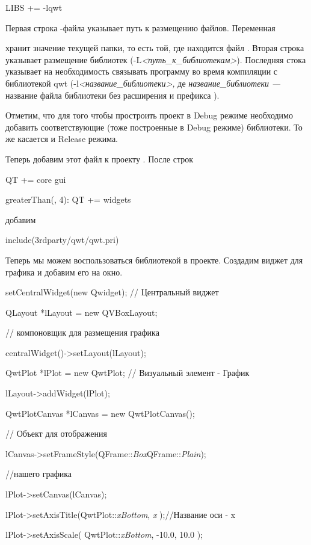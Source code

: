 LIBS += -lqwt

Первая строка -файла указывает путь к размещению
файлов. Переменная 

\Sys{\$\$} хранит значение текущей папки, то есть той, где
находится файл . Вторая строка указывает размещение библиотек
(-L\textit{{<}}\textit{путь\_к\_библиотекам}\textit{{>}}). Последняя стока указывает на
необходимость связывать программу во время компиляции с библиотекой qwt
(-l\textit{{<}}\textit{название\_библиотеки}\textit{{>}, }де \textit{название\_библиотеки}\textit{ ---
}название файла библиотеки без расширения и префикса ).

Отметим, что для того чтобы простроить проект в Debug режиме необходимо добавить соответствующие (тоже построенные в
Debug режиме) библиотеки. То же касается и Release режима. 

Теперь добавим этот файл к проекту . После строк

QT  += core gui

greaterThan(, 4): QT += widgets

добавим

include(3rdparty/qwt/qwt.pri)

Теперь мы можем воспользоваться библиотекой  в проекте. Создадим виджет для графика и добавим его на окно.

setCentralWidget(new Qwidget); // Центральный виджет

QLayout *lLayout = new QVBoxLayout;

// компоновщик для размещения графика

centralWidget()-{>}setLayout(lLayout);

QwtPlot *lPlot = new QwtPlot; // Визуальный элемент - График

lLayout-{>}addWidget(lPlot);

QwtPlotCanvas *lCanvas = new QwtPlotCanvas();

// Объект для отображения

lCanvas-{>}setFrameStyle(QFrame::\textit{Box}{\textbar}QFrame::\textit{Plain});

//нашего графика

lPlot-{>}setCanvas(lCanvas);

lPlot-{>}setAxisTitle(QwtPlot::\textit{xBottom}, \textit{x} );//Название оси - x

lPlot-{>}setAxisScale( QwtPlot::\textit{xBottom}, -10.0, 10.0 );

